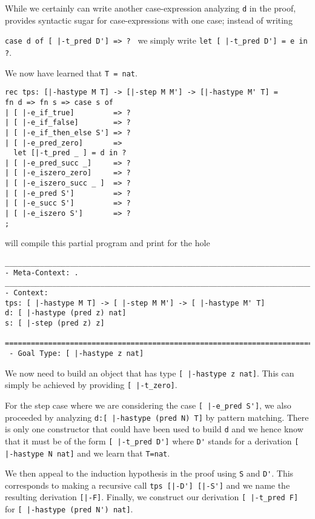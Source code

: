While we certainly can write another case-expression analyzing
\lstinline!d! in the proof, \beluga provides syntactic sugar for
case-expressions with one case; instead of writing

\noindent
\lstinline!case d of [ |-t_pred D'] => ? ! we simply write
\lstinline!let [ |-t_pred D'] = e in ?!.


We now have learned that \lstinline!T = nat!.

\begin{lstlisting}
rec tps: [|-hastype M T] -> [|-step M M'] -> [|-hastype M' T] =
fn d => fn s => case s of
| [ |-e_if_true]         => ?
| [ |-e_if_false]        => ?
| [ |-e_if_then_else S'] => ?
| [ |-e_pred_zero]       =>
  let [|-t_pred _ ] = d in ?
| [ |-e_pred_succ _]     => ?
| [ |-e_iszero_zero]     => ?
| [ |-e_iszero_succ _ ]  => ?
| [ |-e_pred S']         => ?
| [ |-e_succ S']         => ?
| [ |-e_iszero S']       => ?
;
\end{lstlisting}

\beluga will compile this partial program and print for the hole

\begin{lstlisting}
________________________________________________________________________________
- Meta-Context: .
________________________________________________________________________________
- Context:
tps: [ |-hastype M T] -> [ |-step M M'] -> [ |-hastype M' T]
d: [ |-hastype (pred z) nat]
s: [ |-step (pred z) z]

================================================================================
 - Goal Type: [ |-hastype z nat]

\end{lstlisting}



We now need to build an object that has type
\lstinline![ |-hastype z nat]!. This can simply be achieved by
providing
\lstinline![ |-t_zero]!.


For the step case where we are considering the case
\lstinline![ |-e_pred S']!, we also proceeded by analyzing
\lstinline!d:[ |-hastype (pred N) T]! by pattern matching. There is
only one constructor that could have been used to build \lstinline!d!
and we hence know that it must be of the form
\lstinline![ |-t_pred D']! where \lstinline!D'! stands for a
derivation
\lstinline![ |-hastype N nat]! and we learn that \lstinline!T=nat!.

We then appeal to the induction hypothesis in the proof
using \lstinline!S! and \lstinline!D'!. This corresponds to making a
recursive call \lstinline!tps [|-D'] [|-S']! and we name the resulting
derivation \lstinline![|-F]!. Finally, we construct our derivation
\lstinline![ |-t_pred F]! for \lstinline![ |-hastype (pred N') nat]!.

